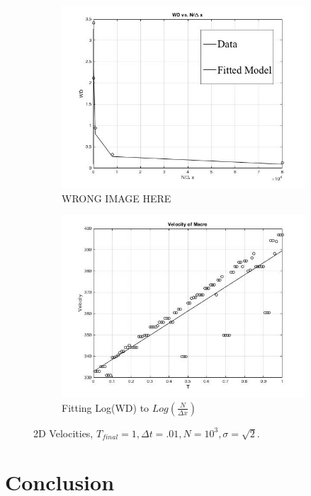 \documentclass[10pt]{article}
\begin{document}
\begin{figure}[H]
\centering
\begin{subfigure}{.5\textwidth}
  \centering
  \includegraphics[width=.9\linewidth]{WDVSNDX.jpg}
  \caption{WRONG IMAGE HERE}
  \label{fig:Fitting2DMicroVelocity}
\end{subfigure}%
\begin{subfigure}{.5\textwidth}
  \centering
  \includegraphics[width=.9\linewidth]{2DMacroVelocity.jpg}
  \caption{Fitting Log(WD) to $Log(\frac{N}{\Delta x})$}
  \label{fig: Fitting2DMacroVelocity}
\end{subfigure}
\caption{2D Velocities, $T_{final} = 1, \Delta t = .01, N = 10^3, \sigma = \sqrt{2}.$}
\label{fig:test}
\end{figure}



\section{Conclusion}
\label{sec: Conclusion}
\end{document}
